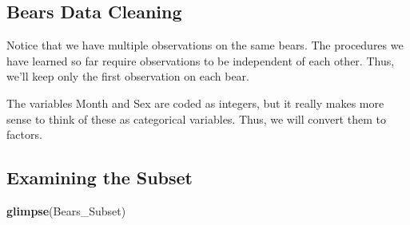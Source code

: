 \documentclass[]{book}
\newenvironment{Shaded}{\begin{snugshade}}{\end{snugshade}}
\newcommand{\KeywordTok}[1]{\textcolor[rgb]{0.13,0.29,0.53}{\textbf{#1}}}
\newcommand{\DecValTok}[1]{\textcolor[rgb]{0.00,0.00,0.81}{#1}}
\newcommand{\StringTok}[1]{\textcolor[rgb]{0.31,0.60,0.02}{#1}}
\newcommand{\OperatorTok}[1]{\textcolor[rgb]{0.81,0.36,0.00}{\textbf{#1}}}
\newcommand{\NormalTok}[1]{#1}
\begin{document}
\subsection{Bears Data Cleaning}\label{bears-data-cleaning}

Notice that we have multiple observations on the same bears. The
procedures we have learned so far require observations to be independent
of each other. Thus, we'll keep only the first observation on each bear.

\begin{Shaded}
\end{Shaded}

The variables Month and Sex are coded as integers, but it really makes
more sense to think of these as categorical variables. Thus, we will
convert them to factors.

\begin{Shaded}
\end{Shaded}

\subsection{Examining the Subset}\label{examining-the-subset}

\begin{Shaded}
\begin{Highlighting}[]
\KeywordTok{glimpse}\NormalTok{(Bears_Subset)}
\end{Highlighting}
\end{Shaded}
\end{document}
